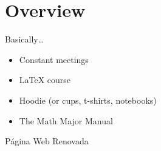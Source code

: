 \begin{frame}
    \maketitle
\end{frame}

\begin{frame}
    
\end{frame}

\section{Overview}

\begin{frame}{Basically\ldots}
    \begin{itemize}
        \item Constant meetings
        \item LaTeX course
        \item Hoodie (or cups, t-shirts, notebooks)
        \item The Math Major Manual
    \end{itemize}
\end{frame}

\begin{frame}{}
    \begin{center}
        {\Huge Página Web Renovada}
    \end{center}
\end{frame}
